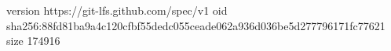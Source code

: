 version https://git-lfs.github.com/spec/v1
oid sha256:88fd81ba9a4c120cfbf55dedc055ceade062a936d036be5d277796171fc77621
size 174916
